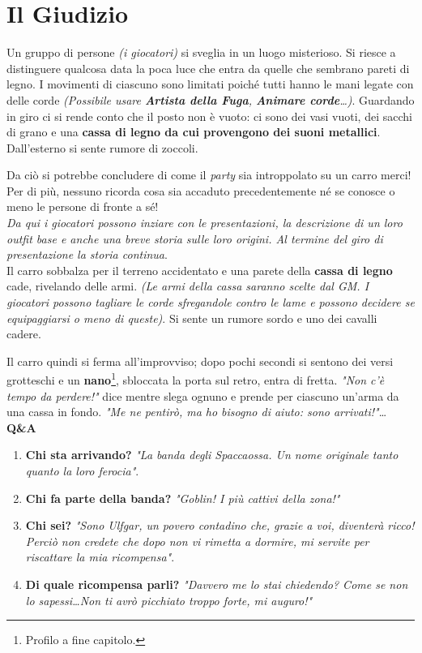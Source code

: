 	\chapter{Il Giudizio}
	
	Un gruppo di persone \textit{(i giocatori)} si sveglia in un luogo misterioso. Si riesce a distinguere qualcosa data la poca luce che entra da quelle che sembrano pareti di legno. I movimenti di ciascuno sono limitati poiché tutti hanno le mani legate con delle corde \emph{(Possibile usare \textbf{Artista della Fuga}, \textbf{Animare corde}\dots)}. Guardando in giro ci si rende conto che il posto non è vuoto: ci sono dei vasi vuoti, dei sacchi di grano e una \textbf{cassa di legno da cui provengono dei suoni metallici}. Dall'esterno si sente rumore di zoccoli.\par Da ciò si potrebbe concludere di come il \textit{party} sia introppolato su un carro merci! Per di più, nessuno ricorda cosa sia accaduto precedentemente né se conosce o meno le persone di fronte a sé!\\
	\HRule{0.5pt}
	\emph{Da qui i giocatori possono inziare con le presentazioni, la descrizione di un loro outfit base e anche una breve storia sulle loro origini. Al termine del giro di presentazione la storia continua}.\\
	\HRule{0.5pt}
		Il carro sobbalza per il terreno accidentato e una parete della \textbf{cassa di legno} cade, rivelando delle armi. \emph{(Le armi della cassa saranno scelte dal GM. I giocatori possono tagliare le corde sfregandole contro le lame e possono decidere se equipaggiarsi o meno di queste)}.
 		 Si sente un rumore sordo e uno dei cavalli cadere.\par Il carro quindi si ferma all'improvviso; dopo pochi secondi si sentono dei versi grotteschi e un \textbf{nano}\footnote{Profilo a fine capitolo.}, sbloccata la porta sul retro, entra di fretta. \textit{"Non c'è tempo da perdere!"} dice mentre slega ognuno e prende per ciascuno un'arma da una cassa in fondo. \textit{"Me ne pentirò, ma ho bisogno di aiuto: sono arrivati!"}\dots\\
 		\HRule{0.5pt}
 		\textbf{Q\&A}
 		\begin{enumerate}
 			\item \textbf{Chi sta arrivando?} \textit{"La banda degli Spaccaossa. Un nome originale tanto quanto la loro ferocia"}.
 			\item \textbf{Chi fa parte della banda?} \textit{"Goblin! I più cattivi della zona!"}
 			\item \textbf{Chi sei?} \textit{"Sono Ulfgar, un povero contadino che, grazie a voi, diventerà ricco! Perciò non credete che dopo non vi rimetta a dormire, mi servite per riscattare la mia ricompensa"}.
 			\item \textbf{Di quale ricompensa parli?} \textit{"Davvero me lo stai chiedendo? Come se non lo sapessi\dots Non ti avrò picchiato troppo forte, mi auguro!"}
 		\end{enumerate}
